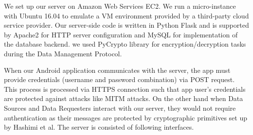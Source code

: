 We set up our server on Amazon Web Services EC2. We run a micro-instance with Ubuntu 16.04 to emulate a VM environment provided by a third-party cloud service provider. Our server-side code is written in Python Flask and is supported by Apache2 for HTTP server configuration and MySQL for implementation of the database backend. we used PyCrypto library for encryption/decryption tasks during the Data Management Protocol.

When our Android application communicates with the server, the app must provide credentials (username and password combination) via POST request. This process is processed via HTTPS connection such that app user's credentials are protected against attacks like MITM attacks. On the other hand when Data Sources and Data Requesters interact with our server, they would not require authentication as their messages are protected by cryptographic primitives set up by Hashimi et al. The server is consisted of following interfaces.

